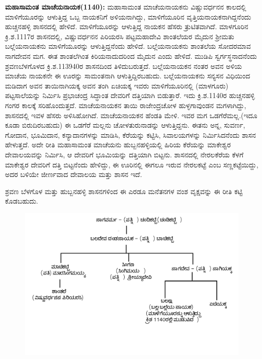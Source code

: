 \textbf{ಮಹಾಸಾಮಂತ ಮಾಚೆಯನಾಯಕ(1140):} ಮಹಾಸಾಮಂತ ಮಾಚೆಯನಾಯಕನು ವಿಷ್ಣುವರ್ಧನನ ಕಾಲದಲ್ಲಿ ಮಾಳಿಗೆಯೂರನ್ನು ಆಳುತ್ತಿದ್ದ ಒಬ್ಬ ನಾಯಕನಿಗೆ ಅಳಿಯನಾಗಿದ್ದು, ಮಾಳಿಗೆಯೂರಿನ ವೃತ್ತಿಯನಾಯಕನಾಗಿದ್ದನೆಂದು ಹುಚ್ಚನಹಳ್ಳಿ ಶಾಸನದಲ್ಲಿ ಹೇಳಿದೆ. ಮಾಳಿಗೆಯೂರನ್ನು ಆಳುತ್ತಿದ್ದ ನಾಯಕನ ಹೆಸರು ತ್ರುಟಿತವಾಗಿದೆ. ಮಾಳಗೂರಿನ ಕ್ರಿ.ಶ.1117ರ ಶಾಸನದಲ್ಲಿ, ವಿಷ್ಣುವರ್ಧನನ ಪಿರಿಯರಸಿ ಪಟ್ಟಮಹಾದೇವಿ ಶಾಂತಲೆಯರ ಮೈದುನ ಶ‍್ರೀಮತು ಬಲ್ಲೆಯ\-ನಾಯಕನು ಮಾಳಿಗೆಯೂರನ್ನು ಆಳುತ್ತಿದ್ದನೆಂದು ಹೇಳಿದೆ. ಬಲ್ಲೆಯನಾಯಕನು ಶಾಂತಲೆಯ ಸೋದರಮಾವ ನಾಗದೇವನ ಮಗ. ಈತ ಶಾಂತಲೆಗಿಂತ ಕಿರಿಯನಾದುದರಿಂದ ಮೈದುನ ಎಂದು ಹೇಳಿದೆ. ಮುಡಿಪಿ ಸ್ವರ್ಗಸ್ಥನಾದನೆಂದು ಶ್ರವಣಬೆಳಗೊಳದ ಕ್ರಿ.ಶ.1139\enginline{-}40ರ ಶಾಸನದಿಂದ ತಿಳಿದುಬರುತ್ತದೆ. ಬಲ್ಲೆಯನಾಯಕನ ನಂತರ ಅವನ ಅಳಿಯ ಮಾಚೆಯ ನಾಯಕನೇ ಈ ಊರನ್ನು ಸಾಮಂತನಾಗಿ ಆಳುತ್ತಿದ್ದಿರಬಹುದು. ಬಲ್ಲೆಯನಾಯಕನು ಸನ್ಯಸನ ವಿಧಿಯಿಂದ ಮಡಿದಾಗ ಅವನ ತಾಯಿ\break ನಾಗಿಯಕ್ಕ ಅವನ ತಂಗಿ ಏಚಿಯಕ್ಕ ಇವರು ಮಾಳಿಗೆಯೂರಿನಲ್ಲಿ (ಮಾಳಗೂರು) ಪಟ್ಟಸಾಲೆಯನ್ನು ನಿರ್ಮಿಸಿ ಪ್ರಭಾಚಂದ್ರ ಸಿದ್ಧಾಂತ ದೇವರಿಗೆ ದತ್ತಿಯಾಗಿ ಬಿಡುತ್ತಾರೆ. ಇದು ಕ್ರಿ.ಶ.1140ರ ಹುಚ್ಚನಹಳ್ಳಿ ಗಂಗರ ಕಾಲಕ್ಕೆ ಸರಿಹೊಂದುತ್ತದೆ. ಮಾಚೆಯನಾಯಕನ ತಾಯಿ ರಾಜೇಂದ್ರಚೋಳ ಹುಳ್ಳಗಾವುಂಡನ ಮಗಳಾಗಿದ್ದು, ಶಾಸನದಲ್ಲಿ ಇವಳ ಹೆಸರು ಅಳಿಸಿಹೋಗಿದೆ. ಮಾಚೆಯನಾಯಕನ ಹೆಂಡತಿ ಮೇಳಿ. ಇವರ ಮಗ ಒಡಗೆರೆಮಲ್ಲ.(ಇದೂ ಕೂಡಾ ಬಿರುದಿರಬಹುದು) ಈ ಒಡಗೆರೆ ಮಲ್ಲನು ಚೋಳತುರುನಾಡನ್ನು ಆಳುತ್ತಿದ್ದನು. ಈತನು ಅನ್ನ, ಸುವರ್ಣ, ಗೋದಾನ, ಭೂಮಿದಾನ, ಕನ್ಯಾದಾನಗಳನ್ನು ಮಾಡಿಸಿ, ಕೆರೆಯನ್ನು ಕಟ್ಟಿಸಿ, ಸಿವಾಲಯಗಳನ್ನು ನಿರ್ಮಿಸಿದನೆಂದು ಶಾಸನ ಹೇಳುತ್ತದೆ. ಅದೇ ರೀತಿ ಮಹಾಸಾಮಂತ ಮಾಚೆಯನು ಹುಬ್ಬನಹಳ್ಳಿಯಲ್ಲಿ ಹಿರಿಯ ಕೆರೆಯನ್ನು ಮಾಕೇಶ್ವರ ದೇವಾಲಯವನ್ನು ನಿರ್ಮಿಸಿ, ಆ ದೇವರಿಗೆ ಭೂಮಿಯನ್ನು ದತ್ತಿಯಾಗಿ ಬಿಟ್ಟನು. ಶಾಸನದಲ್ಲಿ ನೇರಲಕೆರೆಯ ಕೆಳಗೆ ಮಾಕೇಶ್ವರ ದೇವರಿಗೆ ದತ್ತಿ ಬಿಟ್ಟನೆಂದು ಹೇಳಿದ್ದು, ಈ ಊರಿನಲ್ಲಿ ಈಗಲೂ ಇರುವ ನೇರಲಕಟ್ಟೆ ಎಂಬ ಸಣ್ಣಕಟ್ಟೆಯಿದ್ದು, ಅದರ ಬಳಿಯೇ ಜೀರ್ಣವಾದ ದೇವಾಲಯ ಮತ್ತು ಶಾಸನ ಇದೆ.

ಶ್ರವಣ ಬೆಳಗೊಳ ಮತ್ತು ಹುಬ್ಬನಹಳ್ಳಿ ಶಾಸನಗಳಿಂದ ಈ ಎರಡೂ ಮನೆತನಗಳ ವಂಶ ವೃಕ್ಷವನ್ನು ಈ ರೀತಿ ಕಟ್ಟಿ ಕೊಡಬಹುದು.

\begin{figure}[H]
\includegraphics[scale=.98]{images/chap3/chap3fig4-1.jpeg}
\end{figure}


